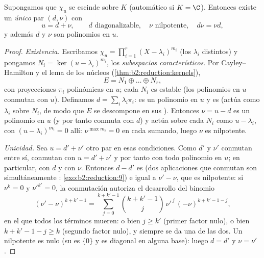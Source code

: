 \begin{theorem}\label{thm:b2:reduction:dunford}
Supongamos que $\chi_u$ se escinde sobre $K$ (automático si $K =
\C$). Entonces existe un \emph{único} par $(d, \nu)$ con
\[
u = d + \nu, \qquad d \text{ diagonalizable}, \quad \nu
\text{ nilpotente}, \quad d\nu = \nu d ,
\]
y además $d$ y $\nu$ son polinomios en
$u$.
\end{theorem}

\begin{proof}
\emph{Existencia.} Escribamos $\chi_u = \prod_{i=1}^{r} (X -
\lambda_i)^{m_i}$ (los $\lambda_i$ distintos) y pongamos $N_i =
\ker(u - \lambda_i)^{m_i}$, los \emph{subespacios característicos}.
Por Cayley--Hamilton y el lema de los núcleos
(\cref{thm:b2:reduction:kernels}),
\[
E = N_1 \oplus \dots \oplus N_r ,
\]
con proyecciones $\pi_i$ polinómicas en $u$; cada $N_i$ es estable
(los polinomios en $u$ conmutan con $u$). Definamos $d = \sum_i
\lambda_i \pi_i$: es un polinomio en $u$ y es  (actúa
como $\lambda_i$ sobre $N_i$, de modo que $E$ se descompone en sus
). Entonces $\nu = u - d$ es un polinomio en $u$
(y por tanto conmuta con $d$) y actúa sobre cada $N_i$ como $u -
\lambda_i$, con $(u - \lambda_i)^{m_i} = 0$ allí: $\nu^{\max m_i} =
0$ en cada sumando, luego $\nu$ es nilpotente.

\emph{Unicidad.} Sea $u = d' + \nu'$ otro par en esas condiciones.
Como $d'$ y $\nu'$ conmutan entre sí, conmutan con $u = d' + \nu'$ y
por tanto con todo polinomio en $u$; en particular, con $d$ y con
$\nu$. Entonces $d - d'$ es  (dos aplicaciones
 que conmutan son simultáneamente
: \cref{exo:b2:reduction:9}) e igual a $\nu' - \nu$,
que es nilpotente: si $\nu^k = 0$ y $\nu'^{k'} = 0$, la conmutación
autoriza el desarrollo del binomio
\[
(\nu' - \nu)^{k + k' - 1}
= \sum_{j=0}^{k+k'-1}\binom{k + k' - 1}{j}
\,\nu'^{\,j}\,(-\nu)^{k + k' - 1 - j} ,
\]
en el que todos los términos mueren: o bien $j \geq k'$ (primer
factor nulo), o bien $k + k' - 1 - j \geq k$ (segundo factor
nulo), y siempre se da una de las dos. Un nilpotente
 es nulo (su  es $\{0\}$ y es diagonal en
alguna base): luego $d = d'$ y $\nu = \nu'$.
\end{proof}

